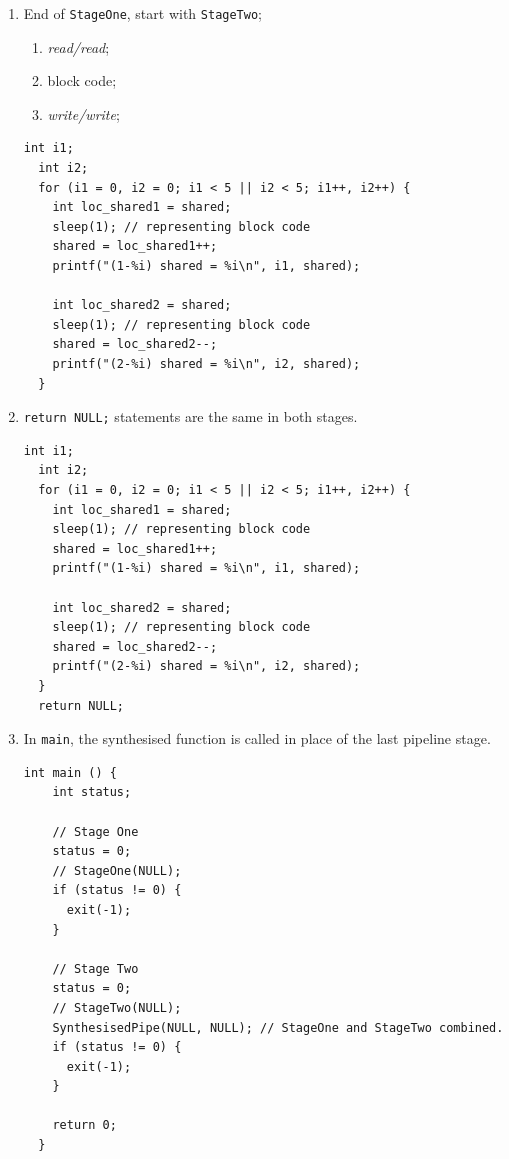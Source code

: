 \begin{enumerate}
\begin{enumerate}
  \item End of \lstinline|StageOne|, start with \lstinline|StageTwo|;
    \begin{enumerate}
    \item \emph{read/read};
    \item block code;
    \item \emph{write/write};
    \end{enumerate}
  \begin{lstlisting}[frame=single]
  int i1;
  int i2;
  for (i1 = 0, i2 = 0; i1 < 5 || i2 < 5; i1++, i2++) {
    int loc_shared1 = shared;
    sleep(1); // representing block code
    shared = loc_shared1++;
    printf("(1-%i) shared = %i\n", i1, shared);  
   
    int loc_shared2 = shared;
    sleep(1); // representing block code
    shared = loc_shared2--;
    printf("(2-%i) shared = %i\n", i2, shared);
  }
  \end{lstlisting}
    
  \item \lstinline|return NULL;| statements are the same in both stages.
  \begin{lstlisting}[frame=single]
  int i1;
  int i2;
  for (i1 = 0, i2 = 0; i1 < 5 || i2 < 5; i1++, i2++) {
    int loc_shared1 = shared;
    sleep(1); // representing block code
    shared = loc_shared1++;
    printf("(1-%i) shared = %i\n", i1, shared);  
   
    int loc_shared2 = shared;
    sleep(1); // representing block code
    shared = loc_shared2--;
    printf("(2-%i) shared = %i\n", i2, shared);
  }
  return NULL;
  \end{lstlisting}
  
  \item In \lstinline|main|, the synthesised function is called in place of the last pipeline stage.
  \begin{lstlisting}[frame=single]
  int main () {
    int status;
  
    // Stage One
    status = 0;
    // StageOne(NULL);
    if (status != 0) {
      exit(-1);
    }
  
    // Stage Two
    status = 0;
    // StageTwo(NULL);
    SynthesisedPipe(NULL, NULL); // StageOne and StageTwo combined.
    if (status != 0) {
      exit(-1);
    }
  
    return 0;
  }
  \end{lstlisting}
  \end{enumerate}


\end{enumerate}
